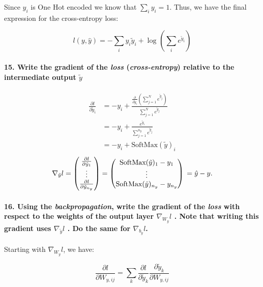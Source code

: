 \documentclass{article}
\theoremstyle{plain}%
\theoremstyle{definition}
\theoremstyle{remark}
\begin{document}
Since $y_i$ is One Hot encoded we know that $\sum_i y_i = 1$. Thus, we have the final expression for the cross-entropy loss:

$$ l(y, \hat{y}) = - \sum_{i}^{} y_i \tilde{y}_i + \log_{} \left(\sum_{i}^{} e^{\tilde{y}_i}\right) $$

\paragraph{15. Write the gradient of the \textit{loss} (\textit{cross-entropy}) relative to the intermediate output $ \tilde{y} $ }
\begin{align*}
    \frac{\partial l}{\partial \tilde{y}_i} & = -y_i + \frac{\frac{\partial }{\partial \tilde{y}_i } (\sum_{j=1}^{N} e^{ \tilde{y}_j })}{\sum_{j=1}^{N} e^{ \tilde{y}_j }} \\
                                            & = - y_i + \frac{e^{\tilde{y}_i}}{\sum_{j=1}^{n_y} e^{ \tilde{y}_j}}                                                          \\
                                            & = - y_i + \text{SoftMax}(\tilde{y})_i
\end{align*}
\[
    \nabla _{\tilde{y}}l = \begin{pmatrix}
        \frac{\partial l}{\partial \tilde{y}_1} \\
        \vdots                                  \\
        \frac{\partial l}{\partial \tilde{y}_{n_y}}
    \end{pmatrix} = \begin{pmatrix}
        \text{SoftMax}(\tilde{y})_1 - y_1 \\
        \vdots                            \\
        \text{SoftMax}(\tilde{y})_{n_y} - y_{n_y}
    \end{pmatrix} \\
    = \hat{y} - y
    .\]

\paragraph{16. Using the \textit{backpropagation}, write the gradient of the \textit{loss} with respect to the weights of the output layer $ \nabla _{W_y}l $ . Note that writing this gradient uses $ \nabla _{\tilde{y}}l $ . Do the same for $ \nabla _{b_y}l $.}

Starting with \( \nabla _{W_y} l \), we have:

\[
    \frac{\partial l}{\partial W_{y,ij}} = \sum_{k}^{} \frac{\partial l}{\partial \tilde{y}_k} \frac{\partial \tilde{y}_k}{\partial W_{y,ij}}
\]
\end{document}
